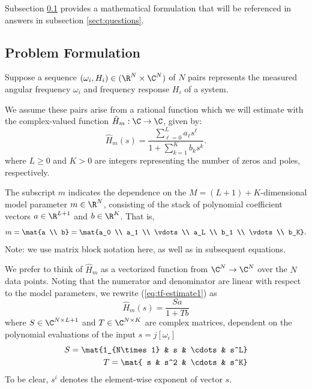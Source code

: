 \documentclass{homework}
\begin{document}
Subsection \ref{sect:problem} provides a mathematical formulation
that will be referenced in answers in subsection \ref{sect:questions}.

\subsection{Problem Formulation}
\label{sect:problem}

Suppose a sequence $(\omega_i, H_i)\in (\R^N \times \C^N)$ of $N$ pairs
represents the measured angular frequency $\omega_i$ and frequency response $H_i$
of a system.

We assume these pairs arise from a rational function which we will estimate
with the complex-valued function $\hat{H}_m: \C \to \C$, given by:
\begin{equation}
    \hat{H}_m(s) = \frac{\sum_{\ell=0}^{L} a_\ell s^\ell}{1 + \sum_{k=1}^{K} b_k s^k}.
    \label{eq:tf-estimate1}
\end{equation}
where $L\geq0$ and $K>0$ are integers representing the number of zeros and poles, 
respectively.

The subscript $m$ indicates the dependence on the $M=(L+1)+K$-dimensional
model parameter $m\in\R^N$, consisting of the stack of polynomial coefficient
vectors $a\in\R^{L+1}$ and $b\in\R^K$. That is,
\begin{equation*}
    m = \mat{a \\ b} = \mat{a_0 \\ a_1 \\ \vdots \\ a_L \\ b_1 \\ \vdots \\ b_K}.
\end{equation*}
Note: we use matrix block notation here, as well as in subsequent equations.

We prefer to think of $\hat{H}_m$ as a vectorized function from $\C^N \to \C^N$
over the $N$ data points. Noting that the numerator and denominator
 are linear with respect to the model parameters, we rewrite
 (\ref{eq:tf-estimate1}) as
\begin{equation*}
    \hat{H}_m(s) = \frac{Sa}{1 + Tb}
\end{equation*}
where $S\in\C^{N\times L+1}$ and $T\in\C^{N \times K}$ are complex matrices,
dependent on the polynomial evaluations of the input $s=j [\omega_i]$
\begin{align*}
    S = \mat{1_{N\times 1} & s & \cdots & s^L} \\
    T = \mat{ s & s^2 & \cdots & s^K}
\end{align*}
To be clear, $s^i$ denotes the element-wise exponent of vector $s$.
\end{document}
